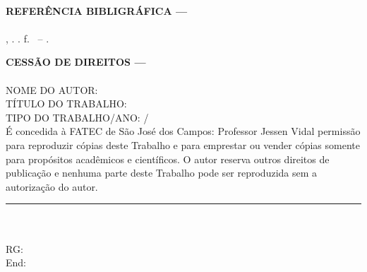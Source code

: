 \noindent{}\\
\parbox{400\unitlength}{
\vspace*{2cm}

\textbf{REFER\^ENCIA BIBLIGR\'AFICA ---} \\ \\
\sobrenomeRef, \nomeRef. \imprimirtitulo \the\year. \pageref{LastPage}f. \imprimirtipotrabalho\ -- \instituicaoRef.

\vspace*{3cm}
\textbf{CESS\~AO DE DIREITOS ---}\\ \\
NOME DO AUTOR: \imprimirautor \\
T\'ITULO DO TRABALHO: \imprimirtitulo \\
TIPO DO TRABALHO/ANO: \imprimirtipotrabalho/\the\year \\

\vspace*{2cm}
É concedida à FATEC de São José dos Campos: Professor Jessen Vidal permissão para reproduzir cópias deste Trabalho e para emprestar ou vender cópias somente para propósitos acadêmicos e científicos. O autor reserva outros direitos de publicação e nenhuma parte deste Trabalho pode ser reproduzida sem a autorização do autor.\\

\vspace*{2cm}
\noindent\rule{7cm}{0.4pt}\\
\imprimirautor \\RG: \rgRef 
\\End: \rgDoisRef


}
